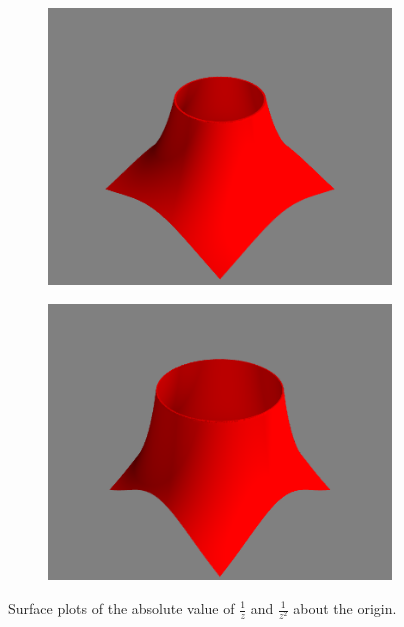 \begin{figure}
\begin{subfigure}{.5\textwidth}
\includegraphics[width=\textwidth]{absinvz.png}
\end{subfigure}
\begin{subfigure}{.5\textwidth}
\includegraphics[width=\textwidth]{absinvz2.png}
\end{subfigure}
\caption{Surface plots of the absolute value of $\frac{1}{z}$ and $\frac{1}{z^2}$ about the origin.}
\label{fig:inv_surfaces}
\end{figure}

